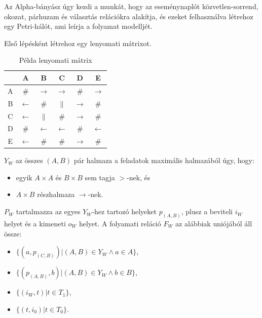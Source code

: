 Az Alpha-bányász úgy kezdi a munkát, hogy az eseménynaplót közvetlen-sorrend, okozat, párhuzam és választás relációkra alakítja, és ezeket felhasználva létrehoz egy Petri-hálót, ami leírja a folyamat modelljét.

Első lépésként létrehoz egy lenyomati mátrixot.

\begin{table}[h!]
\begin{center}
\caption{Példa lenyomati mátrix}
\begin{tabular}{|c | c | c | c | c | c|}
	\hline
	\hspace{0.1cm} & A & B & C & D & E \\
	\hline
	A & \# & $\rightarrow$ & $\rightarrow$ & \# & $\rightarrow$ \\
	\hline
	B & $\leftarrow$ & \# & $\parallel$ & $\rightarrow$ & \# \\
	\hline
	C & $\leftarrow$ & $\parallel$ & \# & $\rightarrow$ & \# \\
	\hline
	D  & \# & $\leftarrow$ & $\leftarrow$ & \# & $\leftarrow$ \\
	\hline
	E & $\leftarrow$ & \# & \# & $\rightarrow$ & \# \\
	\hline
\end{tabular}
\label{fig:example}
\end{center}
\end{table}

\newpage

\noindent $Y_W$ az összes $(A,B)$  pár halmaza a feladatok maximális halmazából úgy, hogy:
\begin{itemize}
	\item {egyik $A \times A$ és $B \times B$ sem tagja $>$-nek, és}
	\item {$A \times B$ részhalmaza $\rightarrow$-nek.}
\end{itemize}
\noindent $P_W$ tartalmazza az egyes $Y_W$-hez tartozó helyeket $p_{(A,B)}$, plusz a beviteli $i_W$ helyet és a kimeneti $o_W$ helyet.
\noindent A folyamati reláció $F_W$ az alábbiak uniójából áll össze:
\begin{itemize}
\item $\{(a,p_{(C,B)})|(A,B) \in Y_W \wedge a \in A\}$,
\item $\{(p_{(A,B)},b)|(A,B) \in Y_W \wedge b \in B\}$,
\item $\{(i_W,t)|t \in T_1\}$,
\item $\{(t,i_0)|t \in T_0\}$.
\end{itemize}

